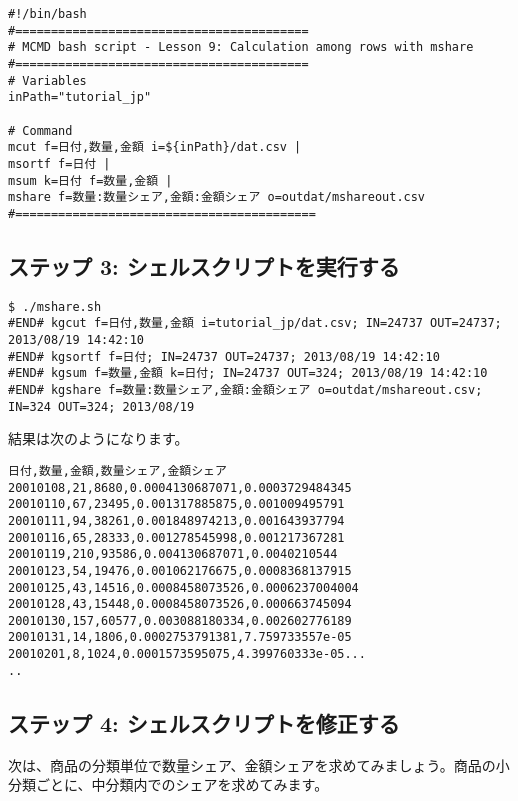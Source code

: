 \begin{verbatim}
#!/bin/bash
#=========================================
# MCMD bash script - Lesson 9: Calculation among rows with mshare
#=========================================
# Variables
inPath="tutorial_jp"

# Command 
mcut f=日付,数量,金額 i=${inPath}/dat.csv |
msortf f=日付 |   
msum k=日付 f=数量,金額 |   
mshare f=数量:数量シェア,金額:金額シェア o=outdat/mshareout.csv
#==========================================
\end{verbatim}

\subsection{ステップ 3: シェルスクリプトを実行する}

\begin{verbatim}
$ ./mshare.sh 
#END# kgcut f=日付,数量,金額 i=tutorial_jp/dat.csv; IN=24737 OUT=24737; 2013/08/19 14:42:10
#END# kgsortf f=日付; IN=24737 OUT=24737; 2013/08/19 14:42:10
#END# kgsum f=数量,金額 k=日付; IN=24737 OUT=324; 2013/08/19 14:42:10
#END# kgshare f=数量:数量シェア,金額:金額シェア o=outdat/mshareout.csv; IN=324 OUT=324; 2013/08/19
\end{verbatim}

\noindent
結果は次のようになります。

\begin{verbatim}
日付,数量,金額,数量シェア,金額シェア
20010108,21,8680,0.0004130687071,0.0003729484345
20010110,67,23495,0.001317885875,0.001009495791
20010111,94,38261,0.001848974213,0.001643937794
20010116,65,28333,0.001278545998,0.001217367281
20010119,210,93586,0.004130687071,0.0040210544
20010123,54,19476,0.001062176675,0.0008368137915
20010125,43,14516,0.0008458073526,0.0006237004004
20010128,43,15448,0.0008458073526,0.000663745094
20010130,157,60577,0.003088180334,0.002602776189
20010131,14,1806,0.0002753791381,7.759733557e-05
20010201,8,1024,0.0001573595075,4.399760333e-05...
..
\end{verbatim}

\subsection{ステップ 4: シェルスクリプトを修正する}

次は、商品の分類単位で数量シェア、金額シェアを求めてみましょう。商品の小分類ごとに、中分類内でのシェアを求めてみます。\\

